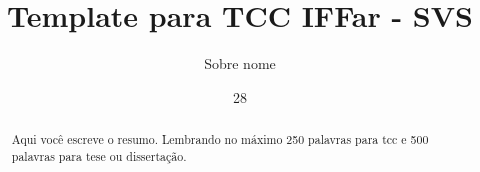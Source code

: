\documentclass[tg]{mdtufsm}
\title{Template para TCC IFFar - SVS}
\author{Sobre nome}{nome do autor}
\date{28}{03}{2018}
\begin{document}
	
	

\maketitle

\restoregeometry

	
\makeapprove




\begin{abstract}
		
Aqui você escreve o resumo. Lembrando no máximo 250 palavras para tcc e 500 palavras para tese ou dissertação.

\end{abstract}
\end{document}
